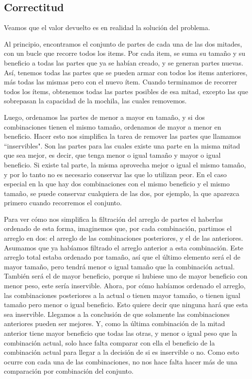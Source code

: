 \documentclass[10pt, a4paper]{article}
\begin{document}
\subsection{Correctitud}
Veamos que el valor devuelto es en realidad la solución del problema. \par
Al principio, encontramos el conjunto de partes de cada una de las dos mitades, con un bucle que recorre todos los items. Por cada item, se suma su tamaño y su beneficio a todas las partes que ya se habían creado, y se generan partes nuevas. Así, tenemos todas las partes que se pueden armar con todos los items anteriores, más todas las mismas pero con el nuevo ítem. Cuando terminamos de recorrer todos los ítems, obtenemos todas las partes posibles de esa mitad, excepto las que sobrepasan la capacidad de la mochila, las cuales removemos.\par
Luego, ordenamos las partes de menor a mayor en tamaño, y si dos combinaciones tienen el mismo tamaño, ordenamos de mayor a menor en beneficio. Hacer esto nos simplifica la tarea de remover las partes que llamamos ``inservibles". Son las partes para las cuales existe una parte en la misma mitad que sea mejor, es decir, que tenga menor o igual tamaño y mayor o igual beneficio. Si existe tal parte, la misma aprovecha mejor o igual el mismo tamaño, y por lo tanto no es necesario conservar las que lo utilizan peor. En el caso especial en la que hay dos combinaciones con el mismo beneficio y el mismo tamaño, se puede conservar cualquiera de las dos, por ejemplo, la que aparezca primero cuando recorremos el conjunto.\par
Para ver cómo nos simplifica la filtración del arreglo de partes el haberlas ordenado de esta forma, imaginemos que, por cada combinación, partimos el arreglo en dos: el arreglo de las combinaciones posteriores, y el de las anteriores. Asumamos que ya habíamos filtrado el arreglo anterior a esta combinación. Este arreglo total estaba ordenado por tamaño, así que el último elemento será el de mayor tamaño, pero tendrá menor o igual tamaño que la combinación actual. También será el de mayor beneficio, porque si hubiese uno de mayor beneficio con menor peso, este sería inservible. Ahora, por cómo habíamos ordenado el arreglo, las combinaciones posteriores a la actual o tienen mayor tamaño, o tienen igual tamaño pero menor o igual beneficio. Esto quiere decir que ninguna hará que esta sea inservible. Llegamos a la conclusión de que solamente las combinaciones anteriores pueden ser mejores. Y, como la última combinación de la mitad anterior tiene mayor beneficio que todas las otras, y menor o igual peso que la combinación actual, solo hace falta comparar con ella el beneficio de la combinación actual para llegar a la decisión de si es inservible o no. Como esto ocurre con cada una de las combinaciones, no nos hace falta hacer más de una comparación por combinación del conjunto.\par
\end{document}
